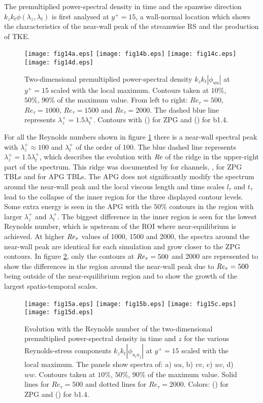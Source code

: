 The premultiplied power-spectral density in time and the spanwise direction $k_zk_t\phi(\lambda_z, \lambda_t)$ is first analysed at $y^+=15$, a wall-normal location which shows the characteristics of the near-wall peak of the streamwise RS and the production of TKE.
\begin{figure}
\texttt{[image: fig14a.eps]}
\texttt{[image: fig14b.eps]}
\texttt{[image: fig14c.eps]}
\texttt{[image: fig14d.eps]}
  \caption{Two-dimensional premultiplied power-spectral density $k_z k_t |\phi_{uu}|$ at $y^+=15$ scaled with the local maximum. Contours taken at $10\%$, $50\%$, $90\%$ of the maximum value. From left to right: $Re_{\tau}=500$, $Re_{\tau}=1000$, $Re_{\tau}=1500$ and $Re_{\tau}=2000$. The dashed blue line represents $\lambda_z^+ = 1.5\lambda_t^+$. Contours with (\protect\blackline) for ZPG and (\protect\orangeline) for b1.4.}
\label{fig:spec2D_uu_y15}
\end{figure}
For all the Reynolds numbers shown in figure \ref{fig:spec2D_uu_y15} there is a near-wall spectral peak with $\lambda_z^+ \approx 100$ and $\lambda_t^+$ of the order of 100. The blue dashed line represents $\lambda_z^+ = 1.5\lambda_t^+$, which describes the evolution with $\mbox{\textit{Re}}$ of the ridge in the upper-right part of the spectrum. This ridge was documented by \cite{Hoyas_PoF2006} for channels, \cite{Sillero_2011}, for ZPG TBLs and \cite{tanarro_2020} for APG TBLs.
The APG does not significantly modify the spectrum around the near-wall peak and the local viscous length and time scales $l_{\tau}$ and $t_{\tau}$ lead to the collapse of the inner region for the three displayed contour levels.
Some extra energy is seen in the APG with the $50\%$ contours in the region with larger $\lambda_z^+$ and $\lambda_t^+$.
The biggest difference in the inner region is seen for the lowest Reynolds number, which is upstream of the ROI where near-equilibrium is achieved. At higher $\mbox{\textit{Re}}_{\tau}$ values of 1000, 1500 and 2000, the spectra around the near-wall peak are identical for each simulation and grow closer to the ZPG contours. In figure \ref{fig:spec2D_uiuj_y15}, only the contours at $\mbox{\textit{Re}}_{\tau}=500$ and 2000 are represented to show the differences in the region around the near-wall peak due to $\mbox{\textit{Re}}_{\tau}=500$ being outside of the near-equilibrium region and to show the growth of the largest spatio-temporal scales.
\begin{figure}
\texttt{[image: fig15a.eps]}
\texttt{[image: fig15b.eps]}
\texttt{[image: fig15c.eps]}
\texttt{[image: fig15d.eps]}
  \caption{Evolution with the Reynolds number of the two-dimensional premultiplied power-spectral density in time and $z$ for the various Reynolds-stress components $k_z k_t |\phi_{u_iu_j}|$ at $y^+=15$ scaled with the local maximum. The panels show spectra of: a) $uu$, b) $vv$, c) $uv$, d) $ww$. Contours taken at $10\%$, $50\%$, $90\%$ of the maximum value. Solid lines for $Re_{\tau}=500$ and dotted lines for $Re_{\tau}=2000$. Colors: (\protect\blackline) for ZPG and (\protect\orangeline) for b1.4.}
\label{fig:spec2D_uiuj_y15}
\end{figure}

